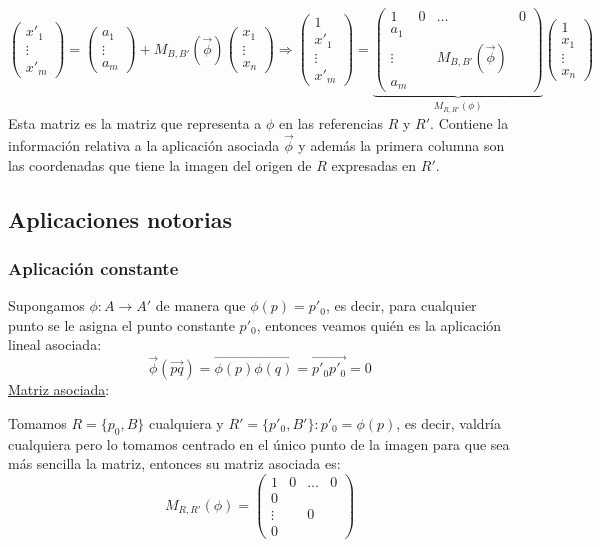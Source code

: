 \documentclass[10pt,a4paper,openright]{book}
\theoremstyle{break}
\begin{document}
$$ \begin{pmatrix}
x'_1 \\ \vdots \\ x'_m
\end{pmatrix} = \begin{pmatrix}
a_1 \\ \vdots \\ a_m
\end{pmatrix}+ M_{B, B'} (\vec{\phi}) \begin{pmatrix}
x_1 \\ \vdots \\ x_n
\end{pmatrix} \Rightarrow  \begin{pmatrix}
1 \\ x'_1 \\ \vdots \\ x'_m
\end{pmatrix} = \underbrace{\left(\begin{array}{c|ccc}
1  & 0 & \ldots & 0 \\
\hline
a_1  &  & & \\
\vdots &  &M_{B, B'} (\vec{\phi}) & \\
a_m & & &
\end{array}
\right)}_{M_{R, R'} (\phi)} \begin{pmatrix}
1 \\ x_1 \\ \vdots \\ x_n
\end{pmatrix} $$
Esta matriz es la matriz que representa a $\phi$ en las referencias $R$ y $R'$. Contiene la información relativa a la aplicación asociada $\vec{\phi}$ y además la primera columna son las coordenadas que tiene la imagen del origen de $R$ expresadas en $R'$.

\subsection{Aplicaciones notorias}
\subsubsection*{Aplicación constante}
Supongamos $\phi : A \to A'$ de manera que $\phi(p) = p'_0$, es decir, para cualquier punto se le asigna el punto constante $p'_0$, entonces veamos quién es la aplicación lineal asociada:
$$\vec{\phi}(\vec{pq}) = \overrightarrow{\phi(p)\phi(q)} = \vec{p'_0 p'_0} = 0$$
\underline{Matriz asociada}:

Tomamos $R = \{p_0, B\}$ cualquiera y $R' = \{p'_0, B'\}: p'_0 = \phi (p)$, es decir, valdría cualquiera pero lo tomamos centrado en el único punto de la imagen para que sea más sencilla la matriz, entonces su matriz asociada es:
$$M_{R, R'} (\phi) = \left(\begin{array}{c|ccc}
1  & 0 & \ldots & 0 \\
\hline
0  &  & & \\
\vdots &  & 0 & \\
0 & & &
\end{array}
\right)$$
\end{document}
